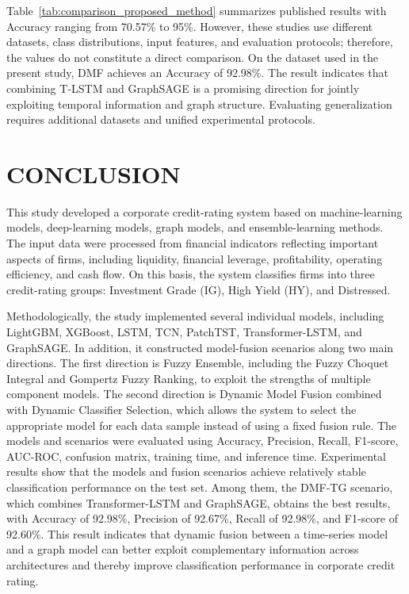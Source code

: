 \documentclass[10pt,twoside]{article}
\begin{document}
Table~\ref{tab:comparison_proposed_method} summarizes published results with Accuracy ranging from 70.57\% to 95\%. However, these studies use different datasets, class distributions, input features, and evaluation protocols; therefore, the values do not constitute a direct comparison. On the dataset used in the present study, DMF achieves an Accuracy of 92.98\%. The result indicates that combining T-LSTM and GraphSAGE is a promising direction for jointly exploiting temporal information and graph structure. Evaluating generalization requires additional datasets and unified experimental protocols.

\section{CONCLUSION}
This study developed a corporate credit-rating system based on machine-learning models, deep-learning models, graph models, and ensemble-learning methods. The input data were processed from financial indicators reflecting important aspects of firms, including liquidity, financial leverage, profitability, operating efficiency, and cash flow. On this basis, the system classifies firms into three credit-rating groups: Investment Grade (IG), High Yield (HY), and Distressed.

Methodologically, the study implemented several individual models, including LightGBM, XGBoost, LSTM, TCN, PatchTST, Transformer-LSTM, and GraphSAGE. In addition, it constructed model-fusion scenarios along two main directions. The first direction is Fuzzy Ensemble, including the Fuzzy Choquet Integral and Gompertz Fuzzy Ranking, to exploit the strengths of multiple component models. The second direction is Dynamic Model Fusion combined with Dynamic Classifier Selection, which allows the system to select the appropriate model for each data sample instead of using a fixed fusion rule. The models and scenarios were evaluated using Accuracy, Precision, Recall, F1-score, AUC-ROC, confusion matrix, training time, and inference time. Experimental results show that the models and fusion scenarios achieve relatively stable classification performance on the test set. Among them, the DMF-TG scenario, which combines Transformer-LSTM and GraphSAGE, obtains the best results, with Accuracy of 92.98\%, Precision of 92.67\%, Recall of 92.98\%, and F1-score of 92.60\%. This result indicates that dynamic fusion between a time-series model and a graph model can better exploit complementary information across architectures and thereby improve classification performance in corporate credit rating.
\end{document}
